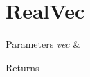 \hypertarget{group__RealVec}{}\section{Real\+Vec}
\label{group__RealVec}

\begin{DoxyParams}{Parameters}
{\em vec} & \\
\hline
\end{DoxyParams}
\begin{DoxyReturn}{Returns}

\end{DoxyReturn}
